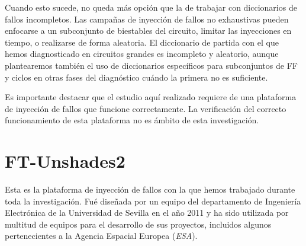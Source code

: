 Cuando esto sucede, no queda más opción que la de trabajar con diccionarios de
fallos incompletos. Las campañas de inyección de fallos no exhaustivas pueden
enfocarse a un subconjunto de biestables del circuito, limitar las inyecciones en 
tiempo, o realizarse de forma aleatoria. El diccionario de partida con el que
hemos diagnosticado en circuitos grandes es incompleto y aleatorio, aunque
plantearemos también el uso de diccionarios específicos para subconjuntos de
\gls{FF} y ciclos en otras fases del diagnóstico cuándo la primera no es
suficiente.

Es importante destacar que el estudio aquí realizado requiere de una plataforma 
de inyección de fallos que funcione correctamente. La verificación del correcto 
funcionamiento de esta plataforma no es ámbito de esta investigación.

\section{FT-Unshades2}
\label{sec:FT-Unshades2}
Esta es la plataforma de inyección de fallos con la que hemos trabajado durante
toda la investigación. Fué diseñada por un equipo del departamento de Ingeniería
Electrónica de la Universidad de Sevilla en el año 2011 \cite{FTU} y ha sido
utilizada por multitud de equipos para el desarrollo de sus proyectos, incluidos
algunos pertenecientes a la Agencia Espacial Europea (\textit{\acrshort{ESA}}).

\endinput
